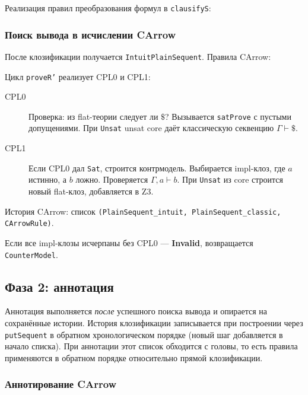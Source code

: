 \documentclass[a4paper,12pt]{article}
\newenvironment{listingcenter}{%
  \begin{center}\begin{minipage}{\linewidth}%
}{%
  \end{minipage}\end{center}%
}
\newcommand{\hssnippet}[2]{%
  \begin{listingcenter}%
  \end{listingcenter}}
\begin{document}
Реализация правил преобразования формул в \texttt{clausifyS}:
\hssnippet{clausifyS-rules.hs}{Преобразования формул в \texttt{clausifyS}}

\subsubsection{Поиск вывода в исчислении CArrow}

После клозификации получается \texttt{IntuitPlainSequent}. Правила CArrow:
\hssnippet{carrow-rules.hs}{Правила CArrow: \texttt{CPL0} и \texttt{CPL1}}

Цикл \texttt{proveR'} реализует CPL0 и CPL1:
\hssnippet{proveR-carrow.hs}{Цикл \texttt{proveR'}: реализация CPL0 и CPL1}

\begin{description}
  \item[CPL0] Проверка: из flat-теории следует ли $\$$? Вызывается
        \texttt{satProve} с пустыми допущениями. При \texttt{Unsat} unsat core
        даёт классическую секвенцию $\Gamma \vdash \$$.
  \item[CPL1] Если CPL0 дал \texttt{Sat}, строится контрмодель. Выбирается
        impl-клоз, где $a$ истинно, а $b$ ложно. Проверяется $\Gamma, a \vdash b$.
        При \texttt{Unsat} из core строится новый flat-клоз, добавляется в Z3.
\end{description}

История CArrow: список
\texttt{(PlainSequent\_intuit, PlainSequent\_classic, CArrowRule)}.

Если все impl-клозы исчерпаны без CPL0 --- \textbf{Invalid}, возвращается
\texttt{CounterModel}.

\subsection{Фаза 2: аннотация}

Аннотация выполняется \emph{после} успешного поиска вывода и опирается на сохранённые
истории. История клозификации записывается при построении через \texttt{putSequent}
в обратном хронологическом порядке (новый шаг добавляется в начало списка).
При аннотации этот список обходится с головы, то есть правила применяются в
обратном порядке относительно прямой клозификации.

\subsubsection{Аннотирование CArrow}
\end{document}
